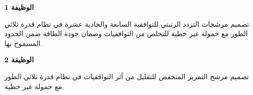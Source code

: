 \documentclass[12pt, a4paper, twoside]{article}
\begin{document}

\clearpage

\newpage
\thispagestyle{empty}
\mbox{}
\newpage

\pagestyle{introstyle} %



\pagestyle{mainstyle}
{
\newpage 
\thispagestyle{empty}
\vfill
{\vspace*{70pt}\fontsize{55}{80}\selectfont
\textbf{الوظيفة 1} \label{part1}
}\\[30pt]
{\fontsize{30}{45}\selectfont
تصميم مرشحات التردد الرنيني  للتوافقية السابعة والحادية عشرة في نظام قدرة ثلاثي الطور مع حمولة غير خطية للتخلص من التوافقيات وضمان جودة الطاقة ضمن الحدود المسموح بها.
\par}
\vfill
\newpage
}




{
\newpage
\thispagestyle{empty}
\vfill
{\vspace*{70pt}\fontsize{55}{80}\selectfont
\textbf{الوظيفة 2} \label{part2}
}\\[30pt]
{\fontsize{30}{45}\selectfont
تصميم مرشح التمرير المنخفض  للتقليل من أثر التوافقيات في نظام قدرة ثلاثي الطور مع حمولة غير خطية.
\par}
\vfill
\newpage
\par}

\setcounter{section}{0} 





\end{document}
